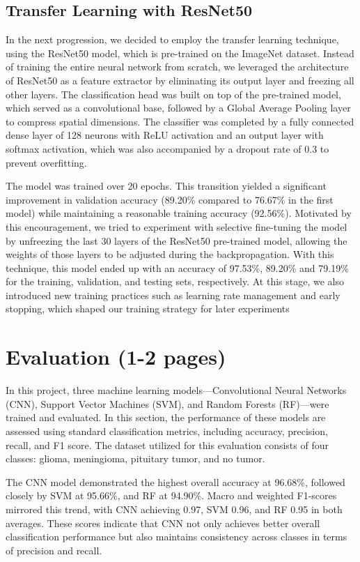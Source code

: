 \documentclass[conference]{IEEEtran}
\begin{document}
\subsection{\large Transfer Learning with ResNet50}
In the next progression, we decided to employ the transfer learning technique, using the ResNet50 model,
which is pre-trained on the ImageNet dataset. Instead of training the entire neural network from scratch, 
we leveraged the architecture of ResNet50 as a feature extractor by eliminating its output layer and freezing all other layers. 
The classification head was built on top of the pre-trained model, which served as a convolutional base, followed by a Global Average Pooling layer to compress spatial dimensions. 
The classifier was completed by a fully connected dense layer of 128 neurons with ReLU activation and an output layer with softmax activation, which was also accompanied by a dropout rate of 0.3 to prevent overfitting. \

The model was trained over 20 epochs. This transition yielded a significant improvement in validation accuracy (89.20\% compared to 76.67\% in the first model) 
while maintaining a reasonable training accuracy (92.56\%). Motivated by this encouragement, we tried to experiment with selective fine-tuning the model by unfreezing the last 30 layers of the ResNet50 pre-trained model, 
allowing the weights of those layers to be adjusted during the backpropagation. With this technique, this model ended up with an accuracy of 97.53\%, 89.20\% and 79.19\% for the training, validation, and testing sets, respectively. At this stage, we also introduced new training practices such as learning rate management and early stopping, which shaped our training strategy for later experiments
\section{\large Evaluation (1-2 pages)}
In this project, three machine learning models—Convolutional Neural Networks (CNN), Support Vector Machines (SVM), and Random Forests (RF)—were trained and evaluated. In this section, the performance of these models are assessed using standard classification metrics, including accuracy, precision, recall, and F1 score. The dataset utilized for this evaluation consists of four classes: glioma, meningioma, pituitary tumor, and no tumor.

The CNN model demonstrated the highest overall accuracy at 96.68\%, followed closely by SVM at 95.66\%, and RF at 94.90\%. Macro and weighted F1-scores mirrored this trend, with CNN achieving 0.97, SVM 0.96, and RF 0.95 in both averages. These scores indicate that CNN not only achieves better overall classification performance but also maintains consistency across classes in terms of precision and recall.
\end{document}
